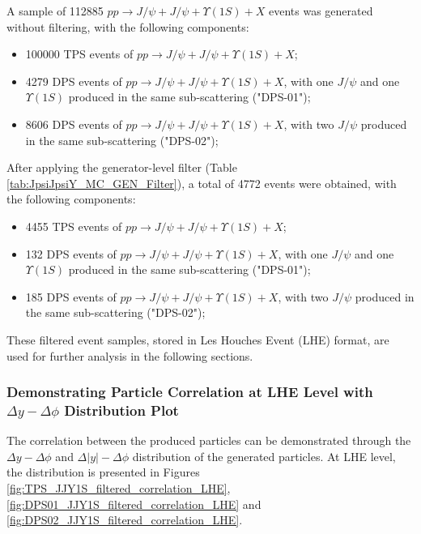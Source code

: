\documentclass[10pt,twocolumn]{article}
\begin{document}
A sample of 112885 $pp\to J/\psi+J/\psi+\Upsilon(1S)+X$ events was generated without filtering, with the following components:

\begin{itemize}
    \item 100000 TPS events of $pp\to J/\psi+J/\psi+\Upsilon(1S)+X$;
    \item 4279 DPS events of $pp\to J/\psi+J/\psi+\Upsilon(1S)+X$, with one $J/\psi$ and one $\Upsilon(1S)$ produced in the same sub-scattering ("DPS-01");
    \item 8606 DPS events of $pp\to J/\psi+J/\psi+\Upsilon(1S)+X$, with two $J/\psi$ produced in the same sub-scattering ("DPS-02");
\end{itemize}

After applying the generator-level filter (Table \ref{tab:JpsiJpsiY_MC_GEN_Filter}), a total of 4772 events were obtained, with the following components:

\begin{itemize}
    \item 4455 TPS events of $pp\to J/\psi+J/\psi+\Upsilon(1S)+X$;
    \item 132 DPS events of $pp\to J/\psi+J/\psi+\Upsilon(1S)+X$, with one $J/\psi$ and one $\Upsilon(1S)$ produced in the same sub-scattering ("DPS-01");
    \item 185 DPS events of $pp\to J/\psi+J/\psi+\Upsilon(1S)+X$, with two $J/\psi$ produced in the same sub-scattering ("DPS-02");
\end{itemize}

These filtered event samples, stored in Les Houches Event (LHE) format, are used for further analysis in the following sections.

\subsubsection{Demonstrating Particle Correlation at LHE Level with $\Delta y - \Delta \phi$ Distribution Plot}

The correlation between the produced particles can be demonstrated through the $\Delta y - \Delta \phi$ and $\Delta |y| - \Delta \phi$ distribution of the generated particles. At LHE level, the distribution is presented in Figures \ref{fig:TPS_JJY1S_filtered_correlation_LHE}, \ref{fig:DPS01_JJY1S_filtered_correlation_LHE} and \ref{fig:DPS02_JJY1S_filtered_correlation_LHE}.
\end{document}
